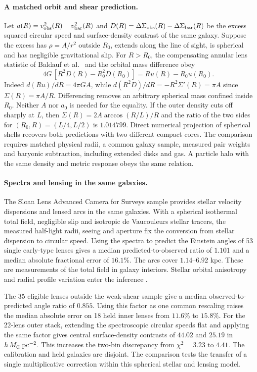 \documentclass[11pt]{article}
\begin{document}
\paragraph{A matched orbit and shear prediction.}
Let $u(R)=v_{\rm obs}^2(R)-v_{\rm bar}^2(R)$ and
$D(R)=\Delta\Sigma_{\rm obs}(R)-\Delta\Sigma_{\rm bar}(R)$
be the excess squared circular speed and surface-density contrast
of the same galaxy. Suppose the excess has $\rho=A/r^2$ outside
$R_0$, extends along the line of sight, is spherical and has negligible
gravitational slip. For $R>R_0$, the compensating annular lens statistic
of Baldauf et al.\ \cite{baldauf2010} and the orbital mass difference obey
\[
 4G\,[R^2D(R)-R_0^2D(R_0)] = R u(R)-R_0u(R_0).
\]
Indeed $d(Ru)/dR=4\pi GA$, while
$d(R^2D)/dR=-R^2\Sigma'(R)=\pi A$ since $\Sigma(R)=\pi A/R$.
Differencing removes an arbitrary spherical mass confined inside $R_0$.
Neither $A$ nor $a_0$ is needed for the equality. If the outer density
cuts off sharply at $L$, then $\Sigma(R)=2A\arccos(R/L)/R$ and the
ratio of the two sides for $(R_0,R)=(L/4,L/2)$ is $1.014799$.
Direct numerical projection of spherical shells recovers both predictions
with two different compact cores. The comparison requires matched physical
radii, a common galaxy sample, measured pair weights and baryonic
subtraction, including extended disks and gas. A particle halo with
the same density and metric response obeys the same relation.

\paragraph{Spectra and lensing in the same galaxies.}
The Sloan Lens Advanced Camera for Surveys sample provides stellar velocity dispersions and
lensed arcs in the same galaxies. With a spherical isothermal total
field, negligible slip and isotropic de Vaucouleurs stellar tracers,
the measured half-light radii, seeing and aperture fix the conversion
from stellar dispersion to circular speed. Using the spectra to predict
the Einstein angles of 53 single early-type lenses gives a median
predicted-to-observed ratio of $1.101$ and a median absolute fractional
error of $16.1\%$. The arcs cover $1.14$--$6.92$ kpc.
These are measurements of the total field in galaxy interiors. Stellar
orbital anisotropy and radial profile variation enter the inference
\cite{bolton2008}.

The 35 eligible lenses outside the weak-shear sample give a median
observed-to-predicted angle ratio of $0.855$. Using this factor as one
common rescaling raises the median absolute error on 18 held inner
lenses from $11.6\%$ to $15.8\%$. For the 22-lens outer stack, extending
the spectroscopic circular speeds flat and applying the same factor
gives central surface-density contrasts of $44.02$ and $25.19$ in
$h\,M_\odot\,{\rm pc}^{-2}$. This
increases the two-bin discrepancy from $\chi^2=3.23$ to $4.41$.
The calibration and held galaxies are disjoint. The comparison tests
the transfer of a single multiplicative correction within this
spherical stellar and lensing model.
\end{document}

